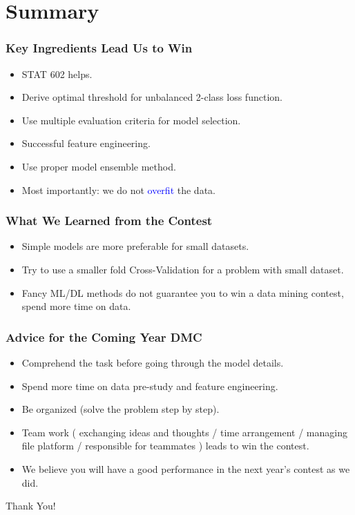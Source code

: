 \documentclass{beamer}
\begin{document}
\section{Summary}

\begin{frame}
\frametitle{Key Ingredients Lead Us to Win}

\begin{itemize}
\item STAT 602 helps.
\item Derive optimal threshold for unbalanced 2-class loss function.
\item Use multiple evaluation criteria for model selection.
\item Successful feature engineering.
\item Use proper model ensemble method.
\item Most importantly: we do not \textcolor{blue}{overfit} the data.
\end{itemize}

\end{frame}



\begin{frame}
\frametitle{What We Learned from the Contest}

\begin{itemize}
\item Simple models are more preferable for small datasets.
\item Try to use a smaller fold Cross-Validation for a problem with small dataset.
\item Fancy ML/DL methods do not guarantee you to win a data mining contest, spend more time on data.
\end{itemize}

\end{frame}




\begin{frame}
\frametitle{Advice for the Coming Year DMC}

\begin{itemize}
\item Comprehend the task before going through the model details.
\item  Spend more time on data pre-study and feature engineering.
\item Be organized (solve the problem step by step).
\item Team work ( exchanging ideas and thoughts / time arrangement / managing file platform / responsible for teammates ) leads to win the contest.
\item We believe you will have a good performance in the next year's contest as we did.
\end{itemize}

\end{frame}




\begin{frame}%
\begin{center}
\Huge Thank You!
\end{center}
\end{frame}
\end{document}
